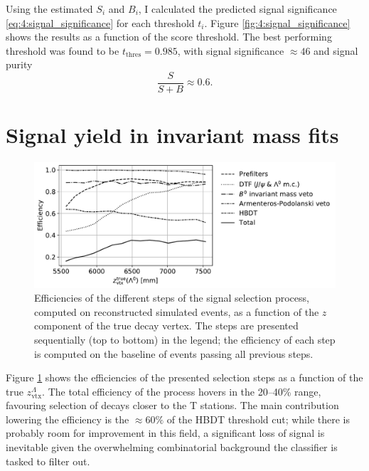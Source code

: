 Using the estimated $S_i$ and $B_i$, I calculated the predicted signal significance \eqref{eq:4:signal_significance} for each threshold $t_i$.
Figure \ref{fig:4:signal_significance} shows the results as a function of the score threshold.
The best performing threshold was found to be $t_\text{thres} = 0.985$, with signal significance $\approx 46$ and signal purity
\begin{equation}
	\frac{S}{S+B} \approx 0.6.
\end{equation}

\section{Signal yield in invariant mass fits}
\label{sec:4:performance_data}

\begin{figure}[t]
	\centering
	\includegraphics[width=\textwidth]{graphics/04-event_selection/selection_efficiencies.pdf}
	\caption{Efficiencies of the different steps of the \demonstratorshort signal selection process, computed on reconstructed simulated events, as a function of the $z$ component of the true \lambdadecay decay vertex. The steps are presented sequentially (top to bottom) in the legend; the efficiency of each step is computed on the baseline of events passing all previous steps.}
	\label{fig:4:selection_efficiencies}
\end{figure}

Figure \ref{fig:4:selection_efficiencies} shows the efficiencies of the presented selection steps as a function of the true $z_\mathrm{vtx}^\Lambda$.
The total efficiency of the process hovers in the 20--40\% range, favouring selection of decays closer to the T stations.
The main contribution lowering the efficiency is the $\approx 60\%$ of the HBDT threshold cut;
while there is probably room for improvement in this field, a significant loss of signal is inevitable given the overwhelming combinatorial background the classifier is tasked to filter out.

